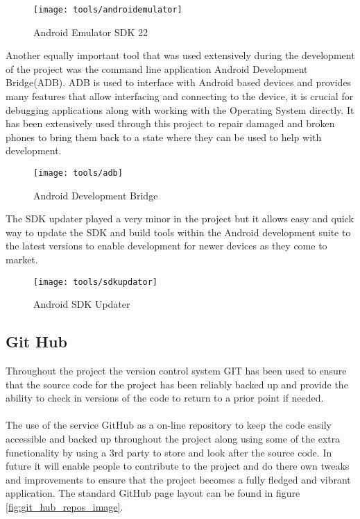 \begin{figure}[H]
    \centering
    \texttt{[image: tools/androidemulator]}
    \caption{Android Emulator SDK 22}
    \label{fig:android_emulator}
\end{figure} 

\noindent
Another equally important tool that was used extensively during the development of the project was the command line application Android Development Bridge(ADB). ADB is used to interface with Android based devices and provides many features that allow interfacing and connecting to the device, it is crucial for debugging applications along with working with the Operating System directly. It has been extensively used through this project to repair damaged and broken phones to bring them back to a state where they can be used to help with development.

\begin{figure}[H]
    \centering
    \texttt{[image: tools/adb]}
    \caption{Android Development Bridge}
    \label{fig:adb_image}
\end{figure} 

\noindent
The SDK updater played a very minor in the project but it allows easy and quick way to update the SDK and build tools within the Android development suite to the latest versions to enable development for newer devices as they come to market.

\begin{figure}[H]
    \centering
    \texttt{[image: tools/sdkupdator]}
    \caption{Android SDK Updater}
    \label{fig:sdk_updator}
\end{figure} 

\subsection*{Git Hub}

Throughout the project the version control system GIT has been used to ensure that the source code for the project has been reliably backed up and provide the ability to check in versions of the code to return to a prior point if needed.\\
\\
The use of the service GitHub as a on-line repository to keep the code easily accessible and backed up throughout the project along using some of the extra functionality by using a 3rd party to store and look after the source code. In future it will enable people to contribute to the project and do there own tweaks and improvements to ensure that the project becomes a fully fledged and vibrant application. The standard GitHub page layout can be found in figure \ref{fig:git_hub_repos_image}.

